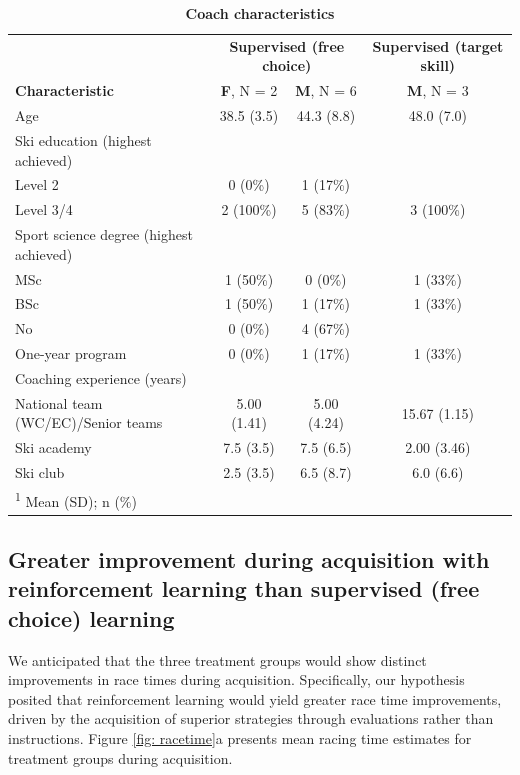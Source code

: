 \documentclass{article}
\begin{document}
\begin{table}
\caption{\textbf{Coach characteristics}}
\centering
\begin{tabular}[H]{l|c|c|c}
\hline
\multicolumn{1}{c|}{ } & \multicolumn{2}{c|}{\textbf{Supervised (free choice)}} & \multicolumn{1}{c}{\textbf{Supervised (target skill)}} \\
\textbf{Characteristic} & \textbf{F}, N = 2 & \textbf{M}, N = 6 & \textbf{M}, N = 3\\
\hline
Age & 38.5 (3.5) & 44.3 (8.8) & 48.0 (7.0)\\
\hline
Ski education (highest achieved) &  &  & \\
\hline
\hspace{1em}Level 2 & 0 (0\%) & 1 (17\%) & \\
\hline
\hspace{1em}Level 3/4 & 2 (100\%) & 5 (83\%) & 3 (100\%)\\
\hline
Sport science degree (highest achieved) &  &  & \\
\hline
\hspace{1em}MSc & 1 (50\%) & 0 (0\%) & 1 (33\%)\\
\hline
\hspace{1em}BSc & 1 (50\%) & 1 (17\%) & 1 (33\%)\\
\hline
\hspace{1em}No & 0 (0\%) & 4 (67\%) & \\
\hline
\hspace{1em}One-year program & 0 (0\%) & 1 (17\%) & 1 (33\%)\\
\hline
Coaching experience (years) &  &  & \\
\hline
\hspace{1em}National team (WC/EC)/Senior teams & 5.00 (1.41) & 5.00 (4.24) & 15.67 (1.15)\\
\hline
\hspace{1em}Ski academy & 7.5 (3.5) & 7.5 (6.5) & 2.00 (3.46)\\
\hline
\hspace{1em}Ski club & 2.5 (3.5) & 6.5 (8.7) & 6.0 (6.6)\\
\hline
\multicolumn{4}{l}{\rule{0pt}{1em}\textsuperscript{1} Mean (SD); n (\%)}\\
\end{tabular}
\end{table} 




\subsection{Greater improvement during acquisition with reinforcement learning than supervised (free choice) learning}\label{result_racetime_acquisition}
We anticipated that the three treatment groups would show distinct improvements in race times during acquisition. Specifically, our hypothesis posited that reinforcement learning would yield greater race time improvements, driven by the acquisition of superior strategies through evaluations rather than instructions. Figure \ref{fig: racetime}a presents mean racing time estimates for treatment groups during acquisition.
\end{document}
